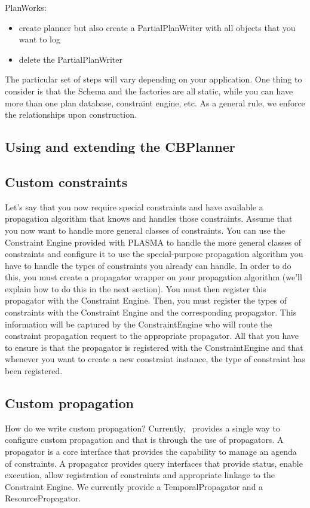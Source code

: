 \documentclass[10pt, letterpaper, twoside]{article}
\begin{document}
PlanWorks:
\begin{itemize}
 \item create planner but also create a PartialPlanWriter with all objects
that you want to log
 \item delete the PartialPlanWriter
\end{itemize}

The particular set of steps will vary depending on your application.  One
thing to consider is that the Schema and the factories are all static,
while you can have more than one plan database, constraint engine, etc. As
a general rule, we enforce the relationships upon construction.

\subsection{Using and extending the CBPlanner}

\subsection{Custom constraints}

Let's say that you now require special constraints and have available a
propagation algorithm that knows and handles those constraints.  Assume
that you now want to handle more general classes of constraints.  You can
use the Constraint Engine provided with PLASMA to handle the more general
classes of constraints and configure it to use the special-purpose
propagation algorithm you have to handle the types of constraints you
already can handle.  In order to do this, you must create a propagator
wrapper on your propagation algorithm (we'll explain how to do this in the
next section).  You must then register this propagator with the Constraint
Engine.  Then, you must register the types of constraints with the
Constraint Engine and the corresponding propagator.  This information will
be captured by the ConstraintEngine who will route the constraint
propagation request to the appropriate propagator.  All that you have to
ensure is that the propagator is registered with the ConstraintEngine and
that whenever you want to create a new constraint instance, the type of
constraint has been registered.

\subsection{Custom propagation}

How do we write custom propagation?  Currently, \ET\, provides a single way
to configure custom propagation and that is through the use of
propagators.  A propagator is a core interface that provides the capability
to manage an agenda of constraints.  A propagator provides query interfaces
that provide status, enable execution, allow registration of constraints
and appropriate linkage to the Constraint Engine.  We currently provide a
TemporalPropagator and a ResourcePropagator.
\end{document}

